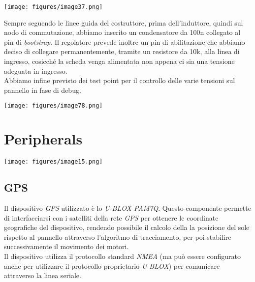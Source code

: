 \begin{center}
\texttt{[image: figures/image37.png]}
\captionsetup{type=figure}
\end{center}

\noindent Sempre seguendo le linee guida del costruttore, prima dell’induttore, 
quindi sul nodo di commutazione, abbiamo inserito un condensatore da 100n collegato al pin di \textit{bootstrap}.
Il regolatore prevede inoltre un pin di abilitazione che abbiamo deciso di collegare permanentemente, 
tramite un resistore da 10k, alla linea di ingresso, cosicché la scheda venga alimentata non appena ci 
sia una tensione adeguata in ingresso.\\
Abbiamo infine previsto dei test point per il controllo delle varie
tensioni sul pannello in fase di debug.

\begin{center}
\texttt{[image: figures/image78.png]}
\captionsetup{type=figure}
\end{center}

\hypertarget{peripherals}{%
\section{Peripherals}\label{peripherals}}

\begin{center}
\texttt{[image: figures/image15.png]}
\captionsetup{type=figure}
\end{center}

\hypertarget{gps}{%
\subsection{\texorpdfstring{GPS}{GPS}}\label{gps}}

Il dispositivo \emph{GPS} utilizzato è lo \emph{U-BLOX PAM7Q}. Questo
componente permette di interfacciarsi con i satelliti della rete \emph{GPS}
per ottenere le coordinate geografiche del dispositivo, rendendo possibile 
il calcolo della la posizione del sole rispetto al
pannello attraverso l'algoritmo di tracciamento, per poi
stabilire successivamente il movimento dei motori.\\
Il dispositivo utilizza il protocollo standard \emph{NMEA} (ma può
essere configurato anche per utilizzare il protocollo proprietario
\emph{U-BLOX}) per comunicare attraverso la linea seriale.

